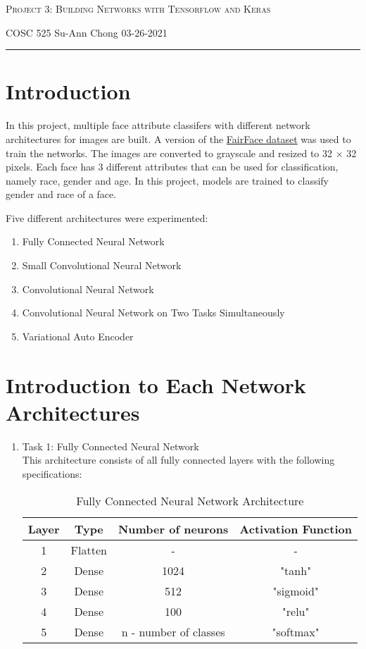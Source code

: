 \documentclass[12pt]{amsart}
\begin{document}
\thispagestyle{empty}

{{\scshape \large Project 3: Building Networks with Tensorflow and Keras} 

\smallskip 

{COSC 525} \hfill { Su-Ann Chong} \hfill{03-26-2021}

\smallskip

\hrule

\bigskip
\section{Introduction}
In this project, multiple face attribute classifers with different network architectures for images are built. A version of the \href{https://github.com/joojs/fairface}{FairFace dataset} was used to train the networks. The images are converted to grayscale and resized to 32 $\times$ 32 pixels. Each face has 3 different attributes that can be used for classification, namely race, gender and age. In this project, models are trained to classify gender and race of a face. 

\bigskip

Five different architectures were experimented:
\begin{enumerate}
	\item Fully Connected Neural Network
	\item Small Convolutional Neural Network
	\item Convolutional Neural Network
	\item Convolutional Neural Network on Two Tasks Simultaneously
	\item Variational Auto Encoder 
\end{enumerate}

\bigskip

\section{Introduction to Each Network Architectures}
\begin{enumerate}

	\item{Task 1: Fully Connected Neural Network} \\

		This architecture consists of all fully connected layers with the following specifications:

		\begin{table}[h]
		\caption{Fully Connected Neural Network Architecture}
		\begin{tabular}{c c c c }
		\hline
		Layer & Type & Number of neurons & Activation Function \\
		\hline
		1 & Flatten & - & - \\
		2 & Dense & 1024 & "tanh" \\
		3 & Dense & 512 & "sigmoid" \\
		4 & Dense & 100 & "relu" \\
		5 & Dense & n - number of classes & "softmax" \\
		\hline 
		\end{tabular}
		\end{table}


\end{enumerate}}
\end{document}
